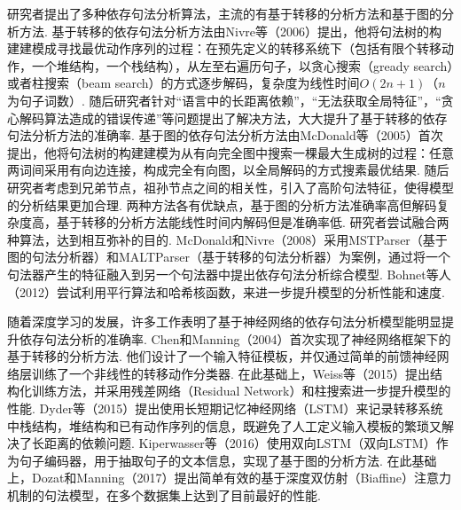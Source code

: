 研究者提出了多种依存句法分析算法，主流的有基于转移的分析方法和基于图的分析方法.
基于转移的依存句法分析方法由Nivre等（2006）提出，他将句法树的构建建模成寻找最优动作序列的过程：在预先定义的转移系统下（包括有限个转移动作，一个堆结构，一个栈结构），从左至右遍历句子，以贪心搜索（gready search）或者柱搜索（beam search）的方式逐步解码，复杂度为线性时间$O(2n+1)$（$n$为句子词数）.
随后研究者针对“语言中的长距离依赖”，“无法获取全局特征”，“贪心解码算法造成的错误传递”等问题提出了解决方法，大大提升了基于转移的依存句法分析方法的准确率.
基于图的依存句法分析方法由McDonald等（2005）首次提出，他将句法树的构建建模为从有向完全图中搜索一棵最大生成树的过程：任意两词间采用有向边连接，构成完全有向图，以全局解码的方式搜素最优结果. 随后研究者考虑到兄弟节点，祖孙节点之间的相关性，引入了高阶句法特征，使得模型的分析结果更加合理.
两种方法各有优缺点，基于图的分析方法准确率高但解码复杂度高，基于转移的分析方法能线性时间内解码但是准确率低. 研究者尝试融合两种算法，达到相互弥补的目的. McDonald和Nivre（2008）采用MSTParser（基于图的句法分析器）和MALTParser（基于转移的句法分析器）为案例，通过将一个句法器产生的特征融入到另一个句法器中提出依存句法分析综合模型. Bohnet等人（2012）尝试利用平行算法和哈希核函数，来进一步提升模型的分析性能和速度.

随着深度学习的发展，许多工作表明了基于神经网络的依存句法分析模型能明显提升依存句法分析的准确率.
Chen和Manning（2004）首次实现了神经网络框架下的基于转移的分析方法. 他们设计了一个输入特征模板，并仅通过简单的前馈神经网络层训练了一个非线性的转移动作分类器. %
在此基础上，Weiss等（2015）提出结构化训练方法，并采用残差网络（Residual Network）和柱搜索进一步提升模型的性能.
Dyder等（2015）提出使用长短期记忆神经网络（LSTM）来记录转移系统中栈结构，堆结构和已有动作序列的信息，既避免了人工定义输入模板的繁琐又解决了长距离的依赖问题.
Kiperwasser等（2016）使用双向LSTM（双向LSTM）作为句子编码器，用于抽取句子的文本信息，实现了基于图的分析方法.
在此基础上，Dozat和Manning（2017）提出简单有效的基于深度双仿射（Biaffine）注意力机制的句法模型，在多个数据集上达到了目前最好的性能.

